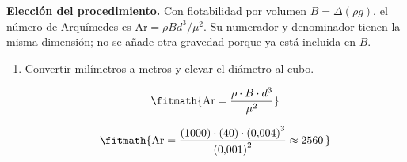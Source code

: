 \noindent\textbf{Elección del procedimiento.} Con flotabilidad por volumen $B=\Delta(\rho g)$, el número de Arquímedes es $\mathrm{Ar}=\rho Bd^3/\mu^2$. Su numerador y denominador tienen la misma dimensión; no se añade otra gravedad porque ya está incluida en $B$.

\begin{enumerate}

\item Convertir milímetros a metros y elevar el diámetro al cubo.

\[\fitmath{\mathrm{Ar}=\frac{\rho\cdot B\cdot {d}^{3}}{{\mu}^{2}}}\]

\[\fitmath{\mathrm{Ar}=\frac{(1000)\cdot (40)\cdot {(0{,}004)}^{3}}{{(0{,}001)}^{2}}\approx 2560\,}\]

\end{enumerate}
